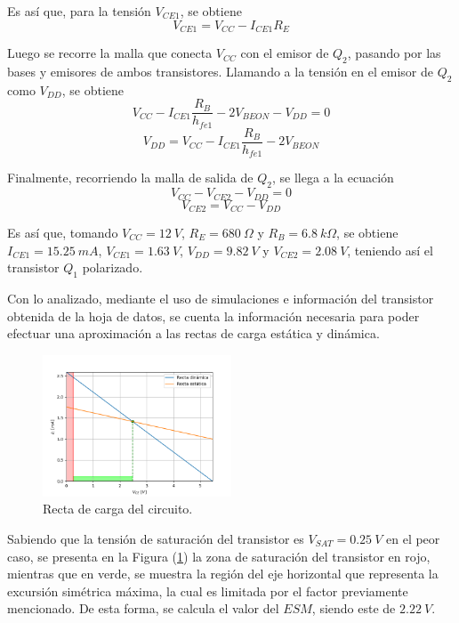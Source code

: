 Es así que, para la tensión $V_{CE1}$, se obtiene
\begin{equation}
	V_{CE1} = V_{CC} - I_{CE1} R_E
\end{equation}

Luego se recorre la malla que conecta $V_{CC}$ con el emisor de $Q_2$, pasando por las bases y emisores de ambos transistores. Llamando a la tensión en el emisor de $Q_2$ como $V_{DD}$, se obtiene
\begin{equation*}
	V_{CC} - I_{CE1} \frac{R_B}{h_{fe1}} - 2 V_{BEON} - V_{DD} = 0
\end{equation*}
\begin{equation}
	V_{DD} = V_{CC} - I_{CE1} \frac{R_B}{h_{fe1}} - 2 V_{BEON}
	\label{equ:vdd}
\end{equation}

Finalmente, recorriendo la malla de salida de $Q_2$, se llega a la ecuación
\begin{equation*}
	V_{CC} - V_{CE2} - V_{DD} = 0
\end{equation*}
\begin{equation}
	V_{CE2} = V_{CC} - V_{DD}
	\label{equ:vce2}
\end{equation}

Es así que, tomando $V_{CC} = 12 \ V$, $R_E = 680 \ \Omega$ y $R_B = 6.8 \ k\Omega$, se obtiene $I_{CE1} = 15.25 \ mA$, $V_{CE1} = 1.63 \ V$, $V_{DD} = 9.82 \ V$ y $V_{CE2} = 2.08 \ V$, teniendo así el transistor $Q_1$ polarizado.

Con lo analizado, mediante el uso de simulaciones e información del transistor obtenida de la hoja de datos, se cuenta la información necesaria para poder efectuar una aproximación a las rectas de carga estática y dinámica.
\begin{figure}[H]
\centering
	\includegraphics[width=0.5\textwidth]{Imagenes/RectaDeCarga.png}
	\caption{Recta de carga del circuito.}
\label{fig:rcarg}
\end{figure}

Sabiendo que la tensión de saturación del transistor es $V_{SAT} = 0.25 \ V$ en el peor caso, se presenta en la Figura (\ref{fig:rcarg}) la zona de saturación del transistor en rojo, mientras que en verde, se muestra la región del eje horizontal que representa la excursión simétrica máxima, la cual es limitada por el factor previamente mencionado. De esta forma, se calcula el valor del $ESM$, siendo este de $2.22 \ V$.

